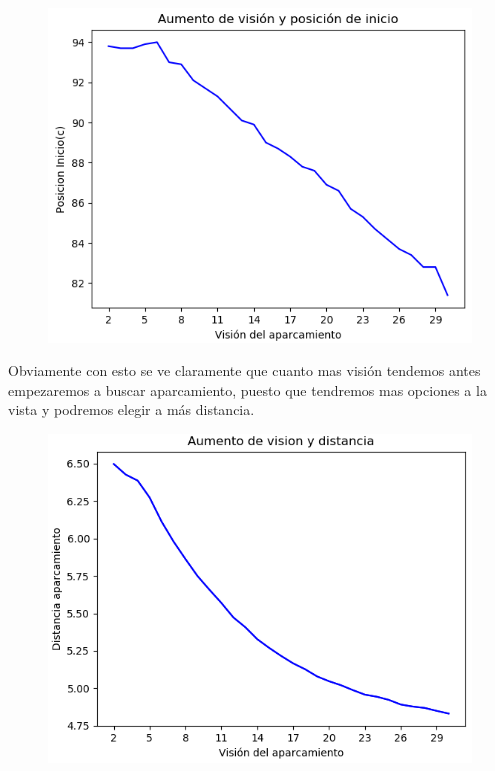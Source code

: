 \documentclass[]{article}
\begin{document}
\begin{figure}[H]
	\centering
	\includegraphics[width=1\linewidth]{img/screenshot011}
	\label{fig:screenshot011}
\end{figure}

Obviamente con esto se ve claramente que cuanto mas visión tendemos antes empezaremos a buscar aparcamiento, puesto que tendremos mas opciones a la vista y podremos elegir a más distancia.

\begin{figure}[H]
	\centering
	\includegraphics[width=1\linewidth]{img/screenshot008}
	\label{fig:screenshot008}
\end{figure}
\end{document}
